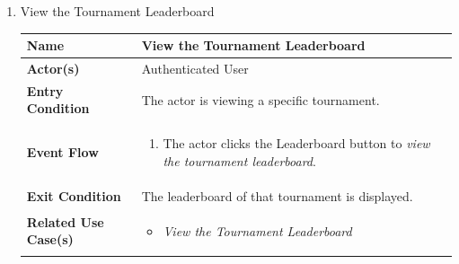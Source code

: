 \begin{enumerate}
\newpage

\item View the Tournament Leaderboard
\begin{center}
    \begin{tabular}{ | m{10em} | m{10cm}| } 
      \hline
      \textbf{Name} & View the Tournament Leaderboard \\ 
      \hline
      \textbf{Actor(s)} & Authenticated User \\ 
      \hline
      \textbf{Entry Condition} & The actor is viewing a specific tournament. \\ 
      \hline
      \textbf{Event Flow} & 
          \begin{enumerate}[(1)]
              \item The actor clicks the Leaderboard button to \textit{view the tournament leaderboard}.
          \end{enumerate}
      \\ 
      \hline
      \textbf{Exit Condition} & The leaderboard of that tournament is displayed.  \\ 
      \hline
      \textbf{Related Use Case(s)} & 
      \begin{itemize}
      \item \textit{View the Tournament Leaderboard}
      \end{itemize}
          \\ 
      \hline
    \end{tabular}
    \label{tbl:uc4}
\end{center}



\end{enumerate}
